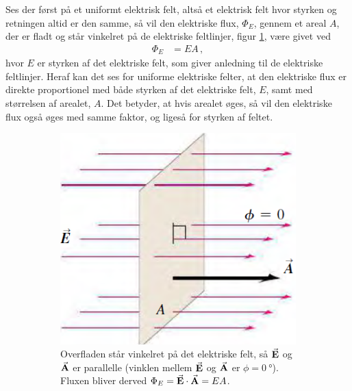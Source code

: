 Ses der først på et uniformt elektrisk felt, altså et elektrisk felt hvor styrken og retningen altid er den samme, så vil den elektriske flux, $\Phi_E$, gennem et areal $A$, der er fladt og står vinkelret på de elektriske feltlinjer, figur \ref{fig:ElectricFlux1}, være givet ved
\begin{align} \label{eq:ElectricFluxUniformFieldFlatPerpendicularArea}
	\Phi_E &= EA \, ,
\end{align}
hvor $E$ er styrken af det elektriske felt, som giver anledning til de elektriske feltlinjer. Heraf kan det ses for uniforme elektriske felter, at den elektriske flux er direkte proportionel med både styrken af det elektriske felt, $E$, samt med størrelsen af arealet, $A$. Det betyder, at hvis arealet øges, så vil den elektriske flux også øges med samme faktor, og ligeså for styrken af feltet.
\begin{figure}[h!]
    \centering
    \begin{subfigure}[t]{.3\textwidth}
        \centering
        \includegraphics[width=\columnwidth]{Elektro/Figurer/ElectricFlux1.PNG}
        \caption{Overfladen står vinkelret på det elektriske felt, så $\va{E}$ og $\va{A}$ er parallelle (vinklen mellem $\va{E}$ og $\va{A}$ er $\phi = \SI{0}{\degree}$). Fluxen bliver derved $\Phi_E = \va{E} \cdot \va{A} = EA$.}
        \label{fig:ElectricFlux1}
    \end{subfigure}
    \hfill
    \begin{subfigure}[t]{.3\textwidth}

\end{subfigure}
\end{figure}
